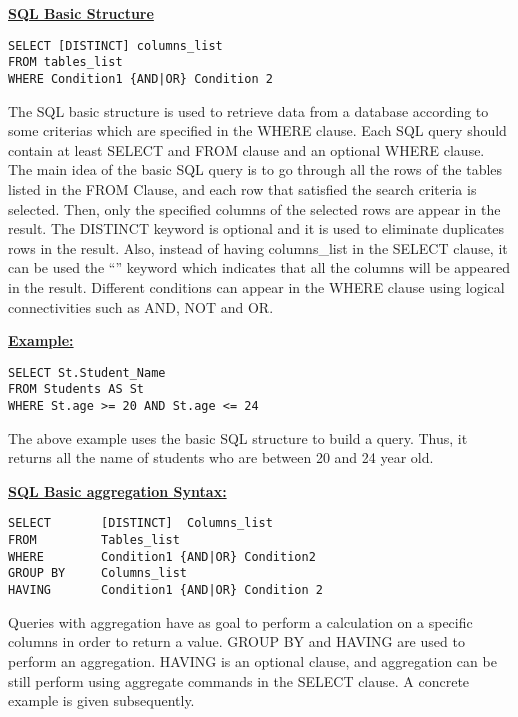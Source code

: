 \noindent\textbf{\underline{SQL Basic Structure}} 
\begin{mdframed}[backgroundcolor=gray!20] 
\begin{lstlisting}
SELECT [DISTINCT] columns_list
FROM tables_list
WHERE Condition1 {AND|OR} Condition 2
\end{lstlisting}
\end{mdframed}
The SQL basic structure is used to retrieve data from a database according to some criterias which are specified in the WHERE clause. Each SQL query should contain at least SELECT and FROM clause and an optional WHERE clause. The main idea of the basic SQL query is to go through all the rows of the tables listed in the FROM Clause, and each row that satisfied the search criteria is selected. Then, only the specified columns of the selected rows are appear in the result. The DISTINCT keyword is optional and it is used to eliminate duplicates rows in the result. Also, instead of having columns\_list in the SELECT clause, it can be used the “\*” keyword which indicates that all the columns will be appeared in the result. Different conditions can appear in the WHERE clause using logical connectivities such as AND, NOT and OR.  

\noindent\textbf{\underline{Example:}}
\begin{mdframed}[backgroundcolor=gray!20] 
\begin{lstlisting}
SELECT St.Student_Name
FROM Students AS St 
WHERE St.age >= 20 AND St.age <= 24
\end{lstlisting}
\end{mdframed}

The above example uses the basic SQL structure to build a query. Thus, it returns all the name of students who are between 20 and 24 year old. 

\noindent\textbf{\underline{SQL Basic aggregation Syntax:} }
\begin{mdframed}[backgroundcolor=gray!20] 
\begin{lstlisting}
SELECT       [DISTINCT]  Columns_list
FROM         Tables_list
WHERE        Condition1 {AND|OR} Condition2
GROUP BY     Columns_list
HAVING       Condition1 {AND|OR} Condition 2
\end{lstlisting}
\end{mdframed}

Queries with aggregation have as goal to perform a calculation on a specific columns in order to return a value. GROUP BY and HAVING are used to perform an aggregation. HAVING is an optional clause, and aggregation can be still perform using aggregate commands in the SELECT clause. A concrete example is given subsequently. 

